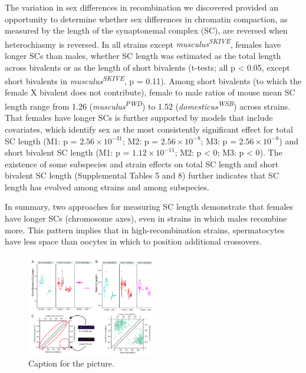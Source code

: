 \documentclass[
]{article}
\begin{document}
The variation in sex differences in recombination we discovered provided
an opportunity to determine whether sex differences in chromatin
compaction, as measured by the length of the synaptonemal complex (SC),
are reversed when heterochiasmy is reversed. In all strains except
\emph{musculus\textsuperscript{SKIVE}}, females have longer SCs than
males, whether SC length was estimated as the total length across
bivalents or as the length of short bivalents (t-tests; all p
\textless{} 0.05, except short bivalents in
\emph{musculus\textsuperscript{SKIVE}}, p = 0.11). Among short bivalents
(to which the female X bivalent does not contribute), female to male
ratios of mouse mean SC length range from 1.26
(\emph{musculus\textsuperscript{PWD}}) to 1.52
(\emph{domesticus\textsuperscript{WSB}}) across strains. That females
have longer SCs is further supported by models that include covariates,
which identify sex as the most consistently significant effect for total
SC length (M1: p = \ensuremath{2.56\times 10^{-31}}; M2: p =
\ensuremath{2.56\times 10^{-8}}; M3: p =
\ensuremath{2.56\times 10^{-8}}) and short bivalent SC length (M1: p =
\ensuremath{1.12\times 10^{-11}}; M2: p \textless{} 0; M3: p \textless{}
0). The existence of some subspecies and strain effects on total SC
length and short bivalent SC length (Supplemental Tables 5 and 8)
further indicates that SC length has evolved among strains and among
subspecies.

In summary, two approaches for measuring SC length demonstrate that
females have longer SCs (chromosome axes), even in strains in which
males recombine more. This pattern implies that in high-recombination
strains, spermatocytes have less space than oocytes in which to position
additional crossovers.

\begin{figure}
\centering
\includegraphics[width=0.5\textwidth,height=\textheight]{Fig3_SC.jpg}
\caption{Caption for the picture.}
\end{figure}
\end{document}
